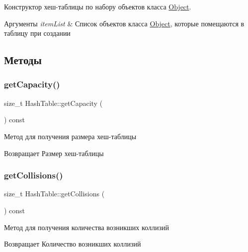 Конструктор хеш-\/таблицы по набору объектов класса \mbox{\hyperlink{structObject}{Object}}. 


\begin{DoxyParams}{Аргументы}
{\em item\+List} & Список объектов класса \mbox{\hyperlink{structObject}{Object}}, которые помещаются в таблицу при создании \\
\hline
\end{DoxyParams}


\subsection{Методы}
\mbox{\label{classHashTable_a9ccba61a7e386b3843c1a621445d5e92}} 
\subsubsection{\texorpdfstring{get\+Capacity()}{getCapacity()}}
{\footnotesize\ttfamily size\+\_\+t Hash\+Table\+::get\+Capacity (\begin{DoxyParamCaption}{ }\end{DoxyParamCaption}) const}



Метод для получения размера хеш-\/таблицы 

\begin{DoxyReturn}{Возвращает}
Размер хеш-\/таблицы 
\end{DoxyReturn}
\mbox{\label{classHashTable_a71b8dca2be787ae6f7b0c2f566d5d708}} 
\subsubsection{\texorpdfstring{get\+Collisions()}{getCollisions()}}
{\footnotesize\ttfamily size\+\_\+t Hash\+Table\+::get\+Collisions (\begin{DoxyParamCaption}{ }\end{DoxyParamCaption}) const}



Метод для получения количества возникших коллизий 

\begin{DoxyReturn}{Возвращает}
Количество возникших коллизий 
\end{DoxyReturn}
\mbox{\label{classHashTable_af2ad1fc31a7f84454cf695a10cae470f}} 
